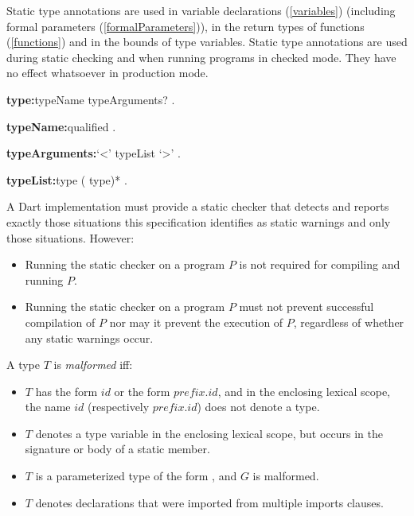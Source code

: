 \documentclass{article}
\begin{document}
\LMHash{}
Static type annotations are used in variable declarations (\ref{variables}) (including formal parameters (\ref{formalParameters})), in the return types of functions (\ref{functions}) and in the bounds of type variables.
Static type annotations are used during static checking and when running programs in checked mode.
They have no effect whatsoever in production mode.

\begin{grammar}
{\bf type:}typeName typeArguments?
  .

{\bf typeName:}qualified
  .

{\bf typeArguments:}`<' typeList `>'
  .

{\bf typeList:}type (\gcomma{} type)*
  .
\end{grammar}

\LMHash{}
A Dart implementation must provide a static checker that detects and reports exactly those situations this specification identifies as static warnings and only those situations.
However:
\begin{itemize}
\item Running the static checker on a program $P$ is not required for compiling and running $P$.
\item Running the static checker on a program $P$ must not prevent successful compilation of $P$ nor may it prevent the execution of $P$, regardless of whether any static warnings occur.
\end{itemize}


\LMHash{}
A type $T$ is {\em malformed} if{}f:
\begin{itemize}
\item $T$ has the form $id$ or the form $prefix.id$, and in the enclosing lexical scope, the name $id$ (respectively $prefix.id$) does not denote a type.
\item $T$ denotes a type variable in the enclosing lexical scope, but occurs in the signature or body of a static member.
\item $T$ is a parameterized type of the form , and $G$ is malformed.
\item $T$ denotes declarations that were imported from multiple imports clauses.
\end{itemize}
\end{document}

